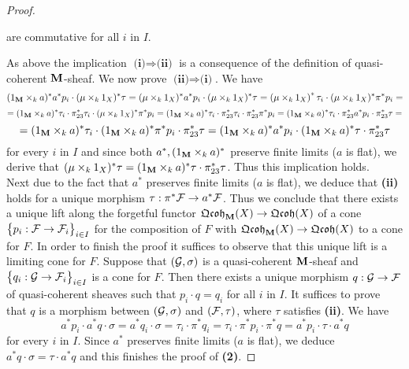 \begin{proof}
\begin{enumerate}[label= \textbf{(\roman*)}, leftmargin=3.0em]
\begin{center}
\end{center}
are commutative for all $i$ in $I$.
\end{enumerate}
As above the implication $\textbf{(i)}\Rightarrow \textbf{(ii)}$ is a consequence of the definition of quasi-coherent $\mathbf{M}$-sheaf. We now prove $\textbf{(ii)}\Rightarrow \textbf{(i)}$. We have
$$(1_{\mathbf{M}}\times_k a)^*a^*p_i \cdot (\mu\times_k 1_X)^*\tau = (\mu \times_k 1_X)^*a^*p_i \cdot (\mu\times_k 1_X)^*\tau = \left(\mu\times_k1_X\right)^*\tau_i \cdot (\mu\times_k1_X)^*\pi^*p_i = $$
$$ = (1_{\mathbf{M}}\times_k a)^*\tau_i \cdot \pi_{23}^*\tau_i \cdot (\mu\times_k1_X)^*\pi^*p_i = (1_{\mathbf{M}}\times_k a)^*\tau_i \cdot \pi_{23}^*\tau_i\cdot \pi_{23}^*\pi^*p_i = (1_{\mathbf{M}}\times_k a)^*\tau_i \cdot \pi_{23}^*a^*p_i\cdot \pi_{23}^*\tau = $$
$$= (1_{\mathbf{M}}\times_k a)^*\tau_i \cdot (1_{\mathbf{M}}\times_ka)^*\pi^*p_i\cdot \pi_{23}^*\tau =(1_{\mathbf{M}}\times_k a)^*a^*p_i\cdot (1_{\mathbf{M}}\times_k a)^*\tau\cdot \pi^*_{23}\tau$$
for every $i$ in $I$ and since both $a^*, (1_{\mathbf{M}}\times_k a)^*$ preserve finite limits ($a$ is flat), we derive that $(\mu\times_k 1_X)^*\tau = (1_{\mathbf{M}}\times_k a)^*\tau\cdot \pi^*_{23}\tau$. Thus this implication holds.\\
Next due to the fact that $a^*$ preserves finite limits ($a$ is flat), we deduce that \textbf{(ii)} holds for a unique morphism $\tau:\pi^*{\mathcal F}\rightarrow a^*{\mathcal F}$. Thus we conclude that there exists a unique lift along the forgetful functor $\mathfrak{Qcoh}_{\mathbf{M}}(X)\rightarrow \mathfrak{Qcoh}(X)$ of a cone $\big\{p_i:{\mathcal F} \rightarrow {\mathcal F}_i\big\}_{i\in I}$ for the composition of $F$ with $\mathfrak{Qcoh}_{\mathbf{M}}(X)\rightarrow \mathfrak{Qcoh}(X)$ to a cone for $F$. In order to finish the proof it suffices to observe that this unique lift is a limiting cone for $F$. Suppose that $({\mathcal G},\sigma)$ is a quasi-coherent $\mathbf{M}$-sheaf and $\big\{q_i:{\mathcal G}\rightarrow {\mathcal F}_i\big\}_{i\in I}$ is a cone for $F$. Then there exists a unique morphism $q:{\mathcal G}\rightarrow {\mathcal F}$ of quasi-coherent sheaves such that $p_i \cdot q = q_i$ for all $i$ in $I$. It suffices to prove that $q$ is a morphism between $({\mathcal G},\sigma)$ and $({\mathcal F},\tau)$, where $\tau$ satisfies \textbf{(ii)}. We have
$$a^*p_i\cdot a^*q \cdot \sigma = a^*q_i\cdot \sigma = \tau_i\cdot \pi^*q_i = \tau_i\cdot \pi^*p_i\cdot \pi^*q = a^*p_i\cdot \tau\cdot a^*q$$
for every $i$ in $I$. Since $a^*$ preserves finite limits ($a$ is flat), we deduce $a^*q \cdot \sigma = \tau\cdot a^*q$ and this finishes the proof of \textbf{(2)}.
\end{proof}

